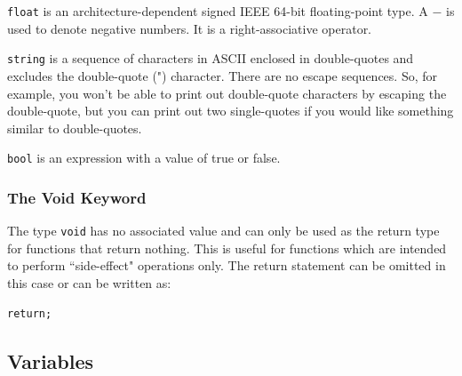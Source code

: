 \documentclass[12pt]{article}
\begin{document}
\lstinline!float! is an architecture-dependent signed IEEE 64-bit floating-point type. A $-$ is used to denote negative numbers. It is a right-associative operator.

\lstinline!string! is a sequence of characters in ASCII enclosed in double-quotes and excludes the double-quote (") character. There are no escape sequences. So, for example, you won't be able to print out double-quote characters by escaping the double-quote, but you can print out two single-quotes if you would like something similar to double-quotes.

\lstinline!bool! is an expression with a value of true or false.\\

\subsubsection{The Void Keyword}
The type \lstinline!void! has no associated value and can only be used as the return type for functions that return nothing. This is useful for functions which are intended to perform ``side-effect" operations only. The return statement can be omitted in this case or can be written as: 
\begin{lstlisting}
return;
\end{lstlisting}

\subsection{Variables}
\end{document}
